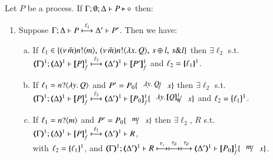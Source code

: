 \begin{proposition}
	\label{prop:lts_corr_HOp_to_HO}
	Let $P$ be a \HOp process.
	If $\Gamma; \emptyset; \Delta \vdash P \triangleright \diamond$ then:
%
	\begin{enumerate}[1.]
		\item
			Suppose $\Gamma; \Delta \vdash P \stackrel{\ell_1}{\longmapsto} \Delta' \vdash P'$. Then we have:
%
			\begin{enumerate}[a)]
				\item
					If $\ell_1 \in \{(\nu\, \tilde{m})n ! \langle m \rangle, \,(\nu\, \tilde{m})n ! \langle \lambda x.\,Q \rangle, \,s \oplus l, \,s \& l\}$
					then $\exists \ell_2$ s.t. \\
					$\horel{\tmap{\Gamma}{1}}{\tmap{\Delta}{1}}{\pmapp{P}{1}{f}}{\hby{\ell_2}}{\tmap{\Delta'}{1}}{\pmapp{P'}{1}{f}}$
					and $\ell_2 = \{\!\!\{\ell_1\}\!\!\}^{1}$.
			
				\item
					If $\ell_1 = n ? \langle \lambda y.\,Q \rangle$ and
					$P' = P_0 \subst{\abs{y}Q}{x}$
					then $\exists \ell_2$ s.t. \\
					$\horel{\tmap{\Gamma}{1}}{\tmap{\Delta}{1}}{\pmapp{P}{1}{f}}{\hby{\ell_2}}{\tmap{\Delta'}{1}}{\pmapp{P_0}{1}{f}\subst{\abs{y}\pmapp{Q}{1}{\emptyset}}{x}}$
					and $\ell_2 = \{\!\!\{\ell_1\}\!\!\}^{1}$.
			
				\item
					If $\ell_1 = n ? \langle m \rangle$
					and 
					$P' = P_0 \subst{m}{x}$
					then $\exists \ell_2$, $R$ s.t. 
					$\horel{\tmap{\Gamma}{1}}{\tmap{\Delta}{1}}{\pmapp{P}{1}{f}}{\hby{\ell_2}}{\tmap{\Delta'}{1}}{R}$, \\
					with $\ell_2 = \{\!\!\{\ell_1\}\!\!\}^{1}$, 
					and
					$\horel{\tmap{\Gamma}{1}}{\tmap{\Delta'}{1}}{R}{\hby{\stau} \hby{\btau} \hby{\btau}}
					{\tmap{\Delta'}{1}}{\pmapp{P_0}{1}{f}\subst{m}{x}}$.
						

\end{enumerate}
\end{enumerate}
\end{proposition}
